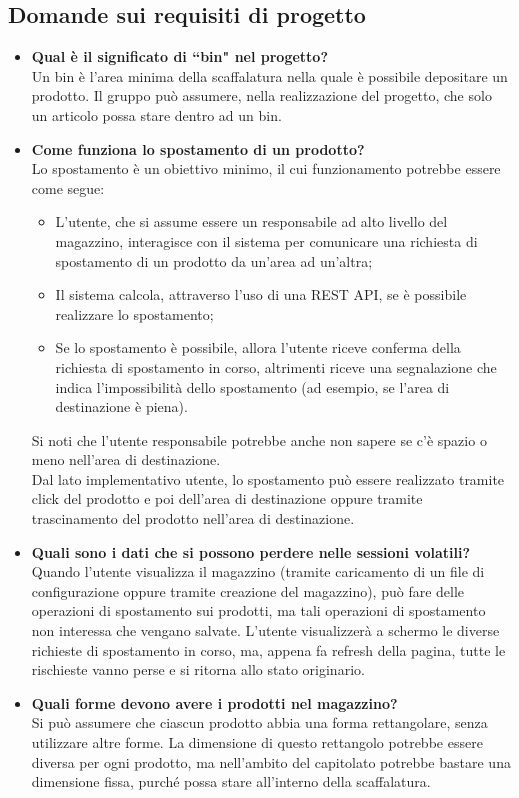 \subsection{Domande sui requisiti di progetto}
\begin{itemize}
        \item \textbf{Qual è il significato di ``bin" nel progetto?}\\
        Un bin è l'area minima della scaffalatura nella quale è possibile depositare un prodotto. Il gruppo può assumere, nella realizzazione del progetto, che solo un articolo possa stare dentro ad un bin.
        \item \textbf{Come funziona lo spostamento di un prodotto?}\\
        Lo spostamento è un obiettivo minimo, il cui funzionamento potrebbe essere come segue:
        \begin{itemize}
            \item L'utente, che si assume essere un responsabile ad alto livello del magazzino, interagisce con il sistema per comunicare una richiesta di spostamento di un prodotto da un'area ad un'altra;
            \item Il sistema calcola, attraverso l'uso di una REST API, se è possibile realizzare lo spostamento;
            \item Se lo spostamento è possibile, allora l'utente riceve conferma della richiesta di spostamento in corso, altrimenti riceve una segnalazione che indica l'impossibilità dello spostamento (ad esempio, se l'area di destinazione è piena).
        \end{itemize}
        Si noti che l'utente responsabile potrebbe anche non sapere se c'è spazio o meno nell'area di destinazione.\\
        Dal lato implementativo utente, lo spostamento può essere realizzato tramite click del prodotto e poi dell'area di destinazione oppure tramite trascinamento del prodotto nell'area di destinazione.
        \item \textbf{Quali sono i dati che si possono perdere nelle sessioni volatili?}\\
        Quando l'utente visualizza il magazzino (tramite caricamento di un file di configurazione oppure tramite creazione del magazzino), può fare delle operazioni di spostamento sui prodotti, ma tali operazioni di spostamento non interessa che vengano salvate. L'utente visualizzerà a schermo le diverse richieste di spostamento in corso, ma, appena fa refresh della pagina, tutte le rischieste vanno perse e si ritorna allo stato originario.
        \item \textbf{Quali forme devono avere i prodotti nel magazzino?}\\
        Si può assumere che ciascun prodotto abbia una forma rettangolare, senza utilizzare altre forme. La dimensione di questo rettangolo potrebbe essere diversa per ogni prodotto, ma nell'ambito del capitolato potrebbe bastare una dimensione fissa, purché possa stare all'interno della scaffalatura.
    \end{itemize}
